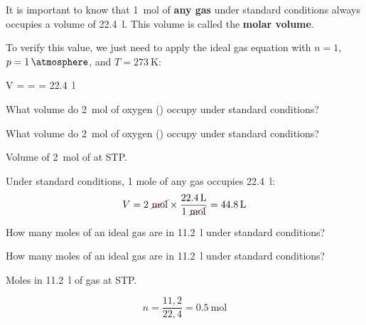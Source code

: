 It is important to know that \qty{1}{\mol} of \textbf{any gas} under standard conditions always occupies a volume of \qty{22.4}{\litre}. This volume is called the \textbf{molar volume}.

To verify this value, we just need to apply the ideal gas equation with \( n=1 \), \( p = \qty{1}{\atmosphere} \), and \( T = \qty{273}{\kelvin} \):
\begin{centeredequation}
    V =  =  = \qty{22.4}{\litre}
\end{centeredequation}
\begin{exercise}
    What volume do \qty{2}{\mole} of oxygen () occupy under standard conditions?
    \begin{solu}
        What volume do \qty{2}{\mole} of oxygen () occupy under standard conditions?

        Volume of \qty{2}{\mole} of  at STP.

        Under standard conditions, 1 mole of any gas occupies \qty{22.4}{\litre}:
        \begin{equation*}
            V = 2\ \cancelred{\unit{\mole}} \times \dfrac{\qty{22.4}{\litre}}{1\ \cancelred{\unit{\mole}}} = \qty{44.8}{\litre}
        \end{equation*}
    \end{solu}
\end{exercise}
\begin{exercise}
    How many moles of an ideal gas are in \qty{11.2}{\litre} under standard conditions?
    \begin{solu}
        How many moles of an ideal gas are in \qty{11.2}{\litre} under standard conditions?

        Moles in \qty{11.2}{\litre} of gas at STP.

        \begin{equation*}
            n = \dfrac{11{,}2}{22{,}4} = \qty{0.5}{\mole}
        \end{equation*}
    \end{solu}
\end{exercise}
